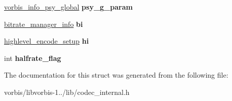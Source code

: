 \begin{DoxyCompactItemize}
\item 
\hypertarget{structcodec__setup__info_a73f2d587bb82d9c1e0c79a8d809c4e37}{\hyperlink{structvorbis__info__psy__global}{vorbis\+\_\+info\+\_\+psy\+\_\+global} {\bfseries psy\+\_\+g\+\_\+param}}\label{structcodec__setup__info_a73f2d587bb82d9c1e0c79a8d809c4e37}

\item 
\hypertarget{structcodec__setup__info_ac8f01db327dffe4b49225debaf14e253}{\hyperlink{structbitrate__manager__info}{bitrate\+\_\+manager\+\_\+info} {\bfseries bi}}\label{structcodec__setup__info_ac8f01db327dffe4b49225debaf14e253}

\item 
\hypertarget{structcodec__setup__info_aedeb89fe833e4b8de6eee1248cef3903}{\hyperlink{structhighlevel__encode__setup}{highlevel\+\_\+encode\+\_\+setup} {\bfseries hi}}\label{structcodec__setup__info_aedeb89fe833e4b8de6eee1248cef3903}

\item 
\hypertarget{structcodec__setup__info_a88a2b7fda297b325bcdfb24ba9c81b49}{int {\bfseries halfrate\+\_\+flag}}\label{structcodec__setup__info_a88a2b7fda297b325bcdfb24ba9c81b49}

\end{DoxyCompactItemize}


The documentation for this struct was generated from the following file\+:\begin{DoxyCompactItemize}
\item 
vorbis/libvorbis-\/1../lib/codec\+\_\+internal.\+h\end{DoxyCompactItemize}
